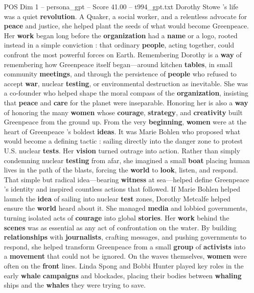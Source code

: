 \begin{textsample}{POS Dim 1 – persona\_gpt – Score 41.00 – t994\_gpt.txt}  \label{ex:f1_pos_028}
Dorothy Stowe ’s life was a quiet \textbf{revolution}.
A Quaker, a social worker, and a relentless advocate for \textbf{peace} and justice, she helped plant the seeds of what would become Greenpeace.
Her \textbf{work} began long before the \textbf{organization} had a \textbf{name} or a logo, rooted instead in a simple conviction : that ordinary \textbf{people}, acting together, could confront the most powerful forces on Earth.
Remembering Dorothy is a \textbf{way} of remembering how Greenpeace itself began—around kitchen \textbf{tables}, in small community \textbf{meetings}, and through the persistence of \textbf{people} who refused to accept \textbf{war}, nuclear \textbf{testing}, or environmental destruction as inevitable.
She was a co-founder who helped shape the moral compass of the \textbf{organization}, insisting that \textbf{peace} and \textbf{care} for the planet were inseparable.
Honoring her is also a \textbf{way} of honoring the many \textbf{women} whose \textbf{courage}, \textbf{strategy}, and \textbf{creativity} built Greenpeace from the ground up.
From the very \textbf{beginning}, \textbf{women} were at the heart of Greenpeace ’s boldest \textbf{ideas}.
It was Marie Bohlen who proposed what would become a defining tactic : sailing directly into the danger zone to protest U.S. nuclear \textbf{tests}.
Her \textbf{vision} turned outrage into action.
Rather than simply condemning nuclear \textbf{testing} from afar, she imagined a small \textbf{boat} placing human lives in the path of the blasts, forcing the \textbf{world} to \textbf{look}, listen, and respond.
That simple but radical idea—bearing \textbf{witness} at sea—helped define Greenpeace ’s identity and inspired countless actions that followed.
If Marie Bohlen helped launch the \textbf{idea} of sailing into nuclear \textbf{test} zones, Dorothy Metcalfe helped ensure the \textbf{world} heard about it.
She managed \textbf{media} and lobbied governments, turning isolated acts of \textbf{courage} into global \textbf{stories}.
Her \textbf{work} behind the \textbf{scenes} was as essential as any act of confrontation on the water.
By building \textbf{relationships} with \textbf{journalists}, crafting messages, and pushing governments to respond, she helped transform Greenpeace from a small \textbf{group} of \textbf{activists} into a \textbf{movement} that could not be ignored.
On the waves themselves, \textbf{women} were often on the \textbf{front} lines.
Linda Spong and Bobbi Hunter played key roles in the early \textbf{whale} \textbf{campaigns} and blockades, placing their bodies between \textbf{whaling} ships and the \textbf{whales} they were trying to save.

\end{textsample}
